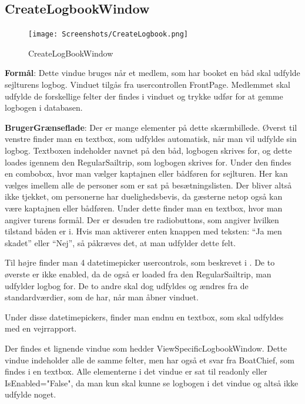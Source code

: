 \subsection{CreateLogbookWindow}

\begin{figure}
    \label{img:login_interface}
    \vspace{-20pt}
    \begin{center}
        \texttt{[image: Screenshots/CreateLogbook.png]}
    \end{center}
    \vspace{-15pt}
    \caption{CreateLogBookWindow}
    \vspace{-30pt}
\end{figure}

\textbf{Formål}: Dette vindue bruges når et medlem, som har booket en båd skal udfylde sejlturens logbog. Vinduet tilgås fra usercontrollen FrontPage. Medlemmet skal udfylde de forskellige felter der findes i vinduet og trykke udfør for at gemme logbogen i databasen.

\textbf{BrugerGrænseflade}: Der er mange elementer på dette skærmbillede. Øverst til venstre finder man en textbox, som udfyldes automatisk, når man vil udfylde sin logbog. 
Textboxen indeholder navnet på den båd, logbogen skrives for, og dette loades igennem den RegularSailtrip, som logbogen skrives for.
Under den findes en combobox, hvor man vælger kaptajnen eller bådføren for sejlturen.
Her kan vælges imellem alle de personer som er sat på besætningslisten. 
Der bliver altså ikke tjekket, om personerne har duelighedsbevis, da gæsterne netop også kan være kaptajnen eller bådføren.
Under dette finder man en textbox, hvor man angiver turens formål. 
Der er desuden tre radiobuttons, som angiver hvilken tilstand båden er i. 
Hvis man aktiverer enten knappen med teksten: ``Ja men skadet'' eller ``Nej'', så påkræves det, at man udfylder dette felt. 

Til højre finder man 4 datetimepicker usercontrols, som beskrevet i . De to øverste er ikke enabled, da de også er loaded fra den RegularSailtrip, man udfylder logbog for. De to andre skal dog udfyldes og ændres fra de standardværdier, som de har, når man åbner vinduet. 

Under disse datetimepickers, finder man endnu en textbox, som skal udfyldes med en vejrrapport.

Der findes et lignende vindue som hedder ViewSpecificLogbookWindow.
Dette vindue indeholder alle de samme felter, men har også et svar fra BoatChief, som findes i en textbox.
Alle elementerne i det vindue er sat til readonly eller IsEnabled="False", da man kun skal kunne se logbogen i det vindue og altså ikke udfylde noget.


